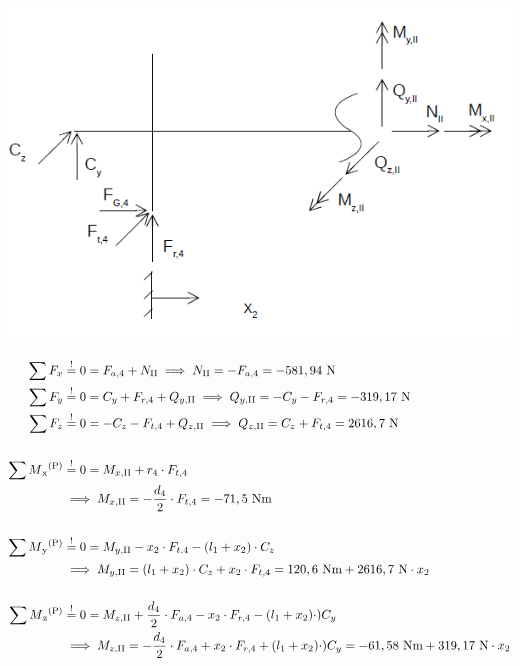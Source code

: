 \begin{enumerate}
\begin{center}
	\includegraphics[width=1\textwidth,keepaspectratio]{figures/Bereich2.png}
\end{center}
\begin{align*}
        \sum F_x &\overset{!}{=} 0 = F_{a,4} + N_{\mathrm{II}} 
				\implies  N_{\mathrm{II}} = - F_{a,4}  =-581,94 \text{ N}\\ 
       \sum F_y &\overset{!}{=} 0 =C_y +F_{r,4} + Q_{y,\mathrm{II}} 
       		\implies  Q_{y,\mathrm{II}} = -C_y - F_{r,4} =-319,17 \text{ N}\\ 
       	\sum F_z &\overset{!}{=} 0 =-C_z -F_{t,4} + Q_{z,\mathrm{II}} 
       		\implies  Q_{z,\mathrm{II}} = C_z + F_{t,4} = 2616,7 \text{ N}\\ \\
        \sum M\textsubscript{x}\textsuperscript{(P)} &\overset{!}{=} 0 = M_{x,\mathrm{II}} + r_4 \x F_{t,4} \\
				&\implies M_{x,\mathrm{II}} = - \frac{d_4}{2} \x F_{t,4}  =  -71,5 \text{ Nm} \\ \\
		\sum M\textsubscript{y}\textsuperscript{(P)} &\overset{!}{=} 0 = M_{y,\mathrm{II}} - x_2 \x F_{t,4} - (l_1 + x_2) \x C_z \\
				&\implies M_{y,\mathrm{II}} = (l_1 + x_2) \x C_z +x_2 \x F_{t,4}  = 120,6\text{ Nm} +2616,7 \text{ N} \x x_2\\ \\
		\sum M\textsubscript{z}\textsuperscript{(P)} &\overset{!}{=} 0 = M_{z,\mathrm{II}} + \frac{d_4 }{2} \x F_{a,4} - x_2 \x F_{r,4} - (l_1 + x_2) \x )C_y \\ 
				&\implies M_{z,\mathrm{II}} = -\frac{d_4}{2} \x F_{a,4} + x_2 \x F_{r,4} + (l_1 + x_2) \x )C_y= -61,58 \text{ Nm} + 319,17 \text{ N} \x x_2 \\

\end{align*}
\end{enumerate}
